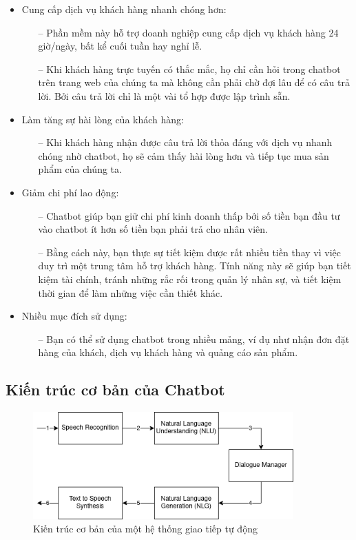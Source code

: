 \begin{itemize}
    \item Cung cấp dịch vụ khách hàng nhanh chóng hơn:
          \begin{itemize}
              \item[--] Phần mềm này hỗ trợ doanh nghiệp cung cấp dịch vụ khách hàng 24 giờ/ngày, bất kể cuối tuần hay nghỉ lễ.
              \item[--] Khi khách hàng trực tuyến có thắc mắc, họ chỉ cần hỏi trong chatbot trên trang web của chúng ta mà không cần phải chờ đợi lâu để có câu trả lời. Bởi câu trả lời chỉ là một vài tổ hợp được lập trình sẵn.
          \end{itemize}
    \item Làm tăng sự hài lòng của khách hàng:
          \begin{itemize}
              \item[--] Khi khách hàng nhận được câu trả lời thỏa đáng với dịch vụ nhanh chóng nhờ chatbot, họ sẽ cảm thấy hài lòng hơn và tiếp tục mua sản phẩm của chúng ta.
          \end{itemize}
    \item Giảm chi phí lao động:
          \begin{itemize}
              \item[--] Chatbot giúp bạn giữ chi phí kinh doanh thấp bởi số tiền bạn đầu tư vào chatbot ít hơn số tiền bạn phải trả cho nhân viên.
              \item[--] Bằng cách này, bạn thực sự tiết kiệm được rất nhiều tiền thay vì việc duy trì một trung tâm hỗ trợ khách hàng. Tính năng này sẽ giúp bạn tiết kiệm tài chính, tránh những rắc rối trong quản lý nhân sự, và tiết kiệm thời gian để làm những việc cần thiết khác.
          \end{itemize}
    \item Nhiều mục đích sử dụng:
          \begin{itemize}
              \item[--] Bạn có thể sử dụng chatbot trong nhiều mảng, ví dụ như nhận đơn đặt hàng của khách, dịch vụ khách hàng và quảng cáo sản phẩm.
          \end{itemize}
\end{itemize}
\subsection{Kiến trúc cơ bản của Chatbot}
\begin{figure}[htp]
    \centering
    \includegraphics[width=10cm]{images/Kiến trúc cơ bản của hệ thống giao tiếp tự động.png}
    \caption{Kiến trúc cơ bản của một hệ thống giao tiếp tự động}
    \label{fig:Kiến trúc cơ bản của hệ thống giao tiếp tự động}
\end{figure}


